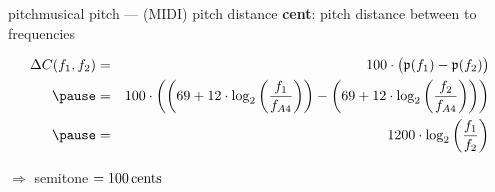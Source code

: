         \begin{frame}{pitch}{musical pitch --- (MIDI) pitch distance}
                \textbf{cent}: pitch distance between to frequencies
                \begin{footnotesize}
                \begin{eqnarray*}\label{eq:cent}
                    \Delta C(f_1,f_2)	&=& 100\cdot\big(\mathfrak{p}(f_1) - \mathfrak{p}(f_2)\big)\\
                                        \pause
                                        &=& 100\cdot\left(\left(69 + 12\cdot\log_2\left(\frac{f_1}{f_{A4}}\right)\right) - \left(69 + 12\cdot\log_2\left(\frac{f_2}{f_{A4}}\right)\right)\right)\\
                                        \pause
                                        &=& 1200\cdot\log_2\left( \frac{f_1}{f_2} \right) 
                \end{eqnarray*}
                \end{footnotesize}
                $\Rightarrow$ semitone $=\unit[100]{cents}$
        \end{frame}
        
